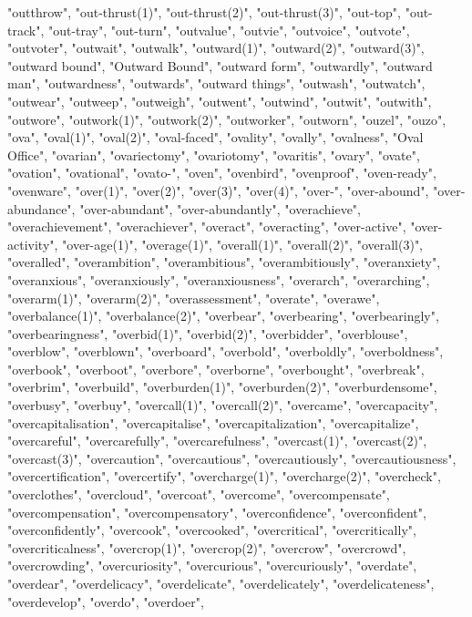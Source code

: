 "outthrow",
"out-thrust(1)",
"out-thrust(2)",
"out-thrust(3)",
"out-top",
"out-track",
"out-tray",
"out-turn",
"outvalue",
"outvie",
"outvoice",
"outvote",
"outvoter",
"outwait",
"outwalk",
"outward(1)",
"outward(2)",
"outward(3)",
"outward bound",
"Outward Bound",
"outward form",
"outwardly",
"outward man",
"outwardness",
"outwards",
"outward things",
"outwash",
"outwatch",
"outwear",
"outweep",
"outweigh",
"outwent",
"outwind",
"outwit",
"outwith",
"outwore",
"outwork(1)",
"outwork(2)",
"outworker",
"outworn",
"ouzel",
"ouzo",
"ova",
"oval(1)",
"oval(2)",
"oval-faced",
"ovality",
"ovally",
"ovalness",
"Oval Office",
"ovarian",
"ovariectomy",
"ovariotomy",
"ovaritis",
"ovary",
"ovate",
"ovation",
"ovational",
"ovato-",
"oven",
"ovenbird",
"ovenproof",
"oven-ready",
"ovenware",
"over(1)",
"over(2)",
"over(3)",
"over(4)",
"over-",
"over-abound",
"over-abundance",
"over-abundant",
"over-abundantly",
"overachieve",
"overachievement",
"overachiever",
"overact",
"overacting",
"over-active",
"over-activity",
"over-age(1)",
"overage(1)",
"overall(1)",
"overall(2)",
"overall(3)",
"overalled",
"overambition",
"overambitious",
"overambitiously",
"overanxiety",
"overanxious",
"overanxiously",
"overanxiousness",
"overarch",
"overarching",
"overarm(1)",
"overarm(2)",
"overassessment",
"overate",
"overawe",
"overbalance(1)",
"overbalance(2)",
"overbear",
"overbearing",
"overbearingly",
"overbearingness",
"overbid(1)",
"overbid(2)",
"overbidder",
"overblouse",
"overblow",
"overblown",
"overboard",
"overbold",
"overboldly",
"overboldness",
"overbook",
"overboot",
"overbore",
"overborne",
"overbought",
"overbreak",
"overbrim",
"overbuild",
"overburden(1)",
"overburden(2)",
"overburdensome",
"overbusy",
"overbuy",
"overcall(1)",
"overcall(2)",
"overcame",
"overcapacity",
"overcapitalisation",
"overcapitalise",
"overcapitalization",
"overcapitalize",
"overcareful",
"overcarefully",
"overcarefulness",
"overcast(1)",
"overcast(2)",
"overcast(3)",
"overcaution",
"overcautious",
"overcautiously",
"overcautiousness",
"overcertification",
"overcertify",
"overcharge(1)",
"overcharge(2)",
"overcheck",
"overclothes",
"overcloud",
"overcoat",
"overcome",
"overcompensate",
"overcompensation",
"overcompensatory",
"overconfidence",
"overconfident",
"overconfidently",
"overcook",
"overcooked",
"overcritical",
"overcritically",
"overcriticalness",
"overcrop(1)",
"overcrop(2)",
"overcrow",
"overcrowd",
"overcrowding",
"overcuriosity",
"overcurious",
"overcuriously",
"overdate",
"overdear",
"overdelicacy",
"overdelicate",
"overdelicately",
"overdelicateness",
"overdevelop",
"overdo",
"overdoer",
